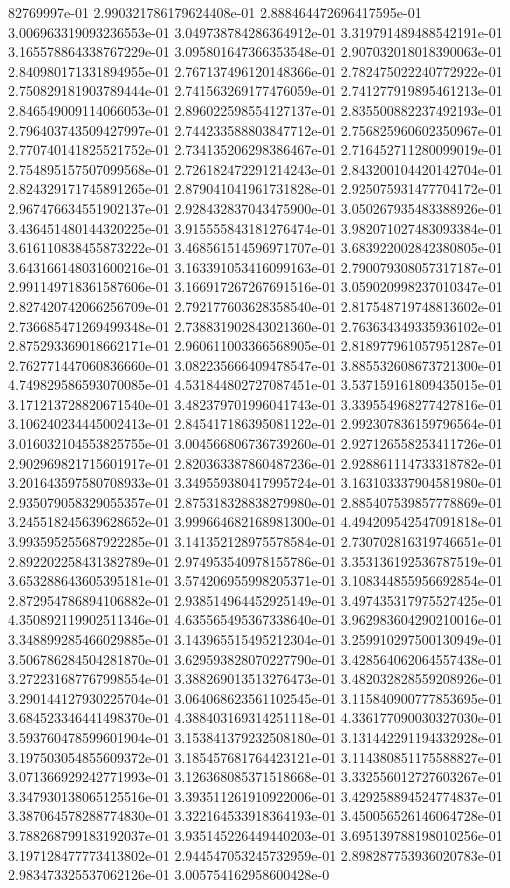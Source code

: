 82769997e-01	2.990321786179624408e-01	2.888464472696417595e-01	3.006963319093236553e-01	3.049738784286364912e-01	3.319791489488542191e-01	3.165578864338767229e-01	3.095801647366353548e-01	2.907032018018390063e-01	2.840980171331894955e-01	2.767137496120148366e-01	2.782475022240772922e-01	2.750829181903789444e-01	2.741563269177476059e-01	2.741277919895461213e-01	2.846549009114066053e-01	2.896022598554127137e-01	2.835500882237492193e-01	2.796403743509427997e-01	2.744233588803847712e-01	2.756825960602350967e-01	2.770740141825521752e-01	2.734135206298386467e-01	2.716452711280099019e-01	2.754895157507099568e-01	2.726182472291214243e-01	2.843200104420142704e-01	2.824329171745891265e-01	2.879041041961731828e-01	2.925075931477704172e-01	2.967476634551902137e-01	2.928432837043475900e-01	3.050267935483388926e-01	3.436451480144320225e-01	3.915555843181276474e-01	3.982071027483093384e-01	3.616110838455873222e-01	3.468561514596971707e-01	3.683922002842380805e-01	3.643166148031600216e-01	3.163391053416099163e-01	2.790079308057317187e-01	2.991149718361587606e-01	3.166917267267691516e-01	3.059020998237010347e-01	2.827420742066256709e-01	2.792177603628358540e-01	2.817548719748813602e-01	2.736685471269499348e-01	2.738831902843021360e-01	2.763634349335936102e-01	2.875293369018662171e-01	2.960611003366568905e-01	2.818977961057951287e-01	2.762771447060836660e-01	3.082235666409478547e-01	3.885532608673721300e-01	4.749829586593070085e-01	4.531844802727087451e-01	3.537159161809435015e-01	3.171213728820671540e-01	3.482379701996041743e-01	3.339554968277427816e-01	3.106240234445002413e-01	2.845417186395081122e-01	2.992307836159796564e-01	3.016032104553825755e-01	3.004566806736739260e-01	2.927126558253411726e-01	2.902969821715601917e-01	2.820363387860487236e-01	2.928861114733318782e-01	3.201643597580708933e-01	3.349559380417995724e-01	3.163103337904581980e-01	2.935079058329055357e-01	2.875318328838279980e-01	2.885407539857778869e-01	3.245518245639628652e-01	3.999664682168981300e-01	4.494209542547091818e-01	3.993595255687922285e-01	3.141352128975578584e-01	2.730702816319746651e-01	2.892202258431382789e-01	2.974953540978155786e-01	3.353136192536787519e-01	3.653288643605395181e-01	3.574206955998205371e-01	3.108344855956692854e-01	2.872954786894106882e-01	2.938514964452925149e-01	3.497435317975527425e-01	4.350892119902511346e-01	4.635565495367338640e-01	3.962983604290210016e-01	3.348899285466029885e-01	3.143965515495212304e-01	3.259910297500130949e-01	3.506786284504281870e-01	3.629593828070227790e-01	3.428564062064557438e-01	3.272231687767998554e-01	3.388269013513276473e-01	3.482032828559208926e-01	3.290144127930225704e-01	3.064068623561102545e-01	3.115840900777853695e-01	3.684523346441498370e-01	4.388403169314251118e-01	4.336177090030327030e-01	3.593760478599601904e-01	3.153841379232508180e-01	3.131442291194332928e-01	3.197503054855609372e-01	3.185457681764423121e-01	3.114380851175588827e-01	3.071366929242771993e-01	3.126368085371518668e-01	3.332556012727603267e-01	3.347930138065125516e-01	3.393511261910922006e-01	3.429258894524774837e-01	3.387064578288774830e-01	3.322164533918364193e-01	3.450056526146064728e-01	3.788268799183192037e-01	3.935145226449440203e-01	3.695139788198010256e-01	3.197128477773413802e-01	2.944547053245732959e-01	2.898287753936020783e-01	2.983473325537062126e-01	3.005754162958600428e-0